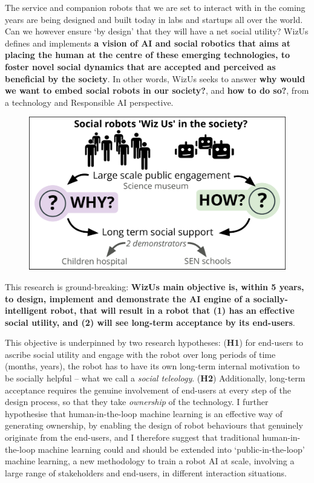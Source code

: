 \documentclass[11pt,a4paper]{report}
\newcommand{\project}{WizUs\xspace}
\begin{document}
The service and companion robots that we are set to interact with in the coming
years are being designed and built today in labs and startups all over the
world. Can we however ensure `by design' that they will have a net social
utility?  \project defines and implements \textbf{a vision of AI and social
robotics that aims at placing the human at the centre of these emerging
technologies, to foster novel social dynamics that are accepted and perceived as
beneficial by the society}. In other words, \project seeks to answer \textbf{why
would we want to embed social robots in our society?}, and \textbf{how to do
so?}, from a technology and Responsible AI perspective.

\begin{figure}
    \centering
    \vspace{-7pt}
    \includegraphics[width=\linewidth]{concept}
    \label{fig|concept}
\end{figure}


This research is ground-breaking: \textbf{\project main objective is, within 5
years, to design, implement and demonstrate the AI engine of a
socially-intelligent robot, that will result in a robot that (1) has an
effective social utility, and (2) will see long-term acceptance by its
end-users}.

This objective is underpinned by two research hypotheses: (\textbf{H1}) for
end-users to ascribe social utility and engage with the robot over long periods
of time (months, years), the robot has to have its own long-term internal
motivation to be socially helpful -- what we call a \emph{social teleology}. (\textbf{H2})
Additionally, long-term acceptance requires the genuine involvement of end-users
at every step of the design process, so that they take \emph{ownership} of the
technology. I further hypothesise that human-in-the-loop machine learning is an
effective way of generating ownership, by enabling the design of robot
behaviours that genuinely originate from the end-users, and I therefore suggest
that traditional human-in-the-loop machine learning could and should be extended
into `public-in-the-loop' machine learning, a new methodology to train a robot
AI at scale, involving a large range of stakeholders and end-users, in different
interaction situations.
\end{document}
